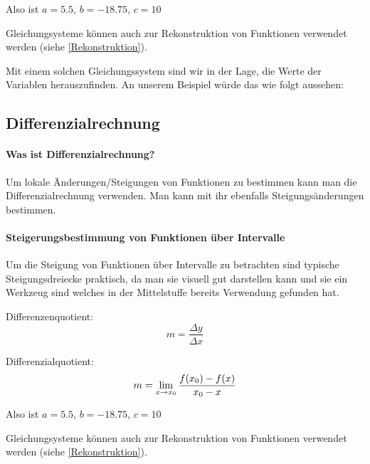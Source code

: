 \documentclass{article}
\begin{document}
			Also ist $a=5.5$, $b=-18.75$, $c=10$
			
			Gleichungsysteme können auch zur Rekonstruktion von Funktionen verwendet werden (siehe \ref{Rekonstruktion}). 

			Mit einem solchen Gleichungssystem sind wir in der Lage, die Werte der Variablen herauszufinden. An unserem Beispiel würde das wie folgt aussehen:


	\subsection{Differenzialrechnung}
		\paragraph{Was ist Differenzialrechnung?}
			Um lokale Änderungen/Steigungen von Funktionen zu bestimmen kann man die Differenzialrechnung verwenden.
			Man kann mit ihr ebenfalls Steigungsänderungen bestimmen.
		\paragraph{Steigerungsbestimmung von Funktionen über Intervalle}

			Um die Steigung von Funktionen über Intervalle zu betrachten sind typische Steigungsdreiecke praktisch,
			da man sie visuell gut darstellen kann und sie ein Werkzeug sind welches in der Mittelstuffe bereits
			Verwendung gefunden hat.
			 
			Differenzenquotient:
			\[
			    m = {\frac {\Delta y} {\Delta x}}
			\]
			
			Differenzialquotient:
			\[
			    m = \lim_{x \to x_{0}} {{f(x_{0}) - f(x)} \over { x_{0} - x}}
			\]

			Also ist $a=5.5$, $b=-18.75$, $c=10$

			Gleichungsysteme können auch zur Rekonstruktion von Funktionen verwendet werden (siehe \ref{Rekonstruktion}). 
\end{document}
